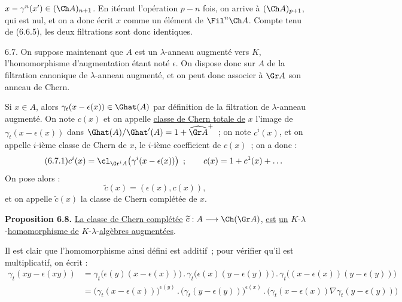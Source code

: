 
\(x-\gamma^n(x')\in(\Ch A)_{n+1}\). En
itérant l'opération \(p-n\) fois, on arrive à \((\Ch A)_{p+1}\), qui est nul, et on a donc écrit \(x\) comme un élément de \(\Fil^n\Ch A\). Compte tenu de (6.6.5), les deux filtrations sont donc identiques.

6.7. On suppose maintenant que \(A\) est un \(\lambda\)-anneau augmenté vers \(K\), l'homomorphisme d'augmentation étant noté \(\epsilon\). On dispose donc sur \(A\) de la filtration canonique de \(\lambda\)-anneau augmenté, et on peut donc associer à \(\Gr A\) son anneau de Chern.

Si \(x\in A\), alors \(\gamma_t(x-\epsilon(x))\in\Ghat(A)\) par définition de la filtration de \(\lambda\)-anneau augmenté. On note \(c(x)\) et on appelle \uline{classe de Chern totale de} \(x\) l'image de \(\gamma_t(x-\epsilon(x))\) dans \(\Ghat(A)/\Ghat'(A)=1+\widehat{\Gr A}^{+}\)~; on note \(c^i(x)\), et on appelle \(i\)-ième classe de Chern de \(x\), le \(i\)-ième coefficient de \(c(x)\)~; on a donc :
\begin{equation}\tag{6.7.1}
  c^i(x)=\cl_{\Gr^iA}\!\left(\gamma^i(x-\epsilon(x))\right)~;\qquad
  c(x)=1+c^1(x)+\ldots
\end{equation}
On pose alors :
\begin{equation}\tag{6.7.2}
  \widetilde c(x)=(\epsilon(x),c(x)),
\end{equation}
et on appelle \(\widetilde c(x)\) la classe de Chern complétée de \(x\).

\textbf{Proposition 6.8.} \uline{La classe de Chern complétée} \(\widetilde c:A\longrightarrow\Ch(\Gr A)\), \uline{est} \uline{un} \(K\)-\(\lambda\)-\uline{homomorphisme de} \(K\)-\(\lambda\)-\uline{algèbres augmentées}.

Il est clair que l'homomorphisme ainsi défini est additif~; pour vérifier qu'il est multiplicatif, on écrit :
\[
\begin{aligned}
\gamma_t(xy-\epsilon(xy))
&=\gamma_t\bigl(\epsilon(y)(x-\epsilon(x))\bigr)\mathbin{.}
  \gamma_t\bigl(\epsilon(x)(y-\epsilon(y))\bigr)\mathbin{.}
  \gamma_t\bigl((x-\epsilon(x))(y-\epsilon(y))\bigr)\\
&=\bigl(\gamma_t(x-\epsilon(x))\bigr)^{\epsilon(y)}\mathbin{.}
  \bigl(\gamma_t(y-\epsilon(y))\bigr)^{\epsilon(x)}\mathbin{.}
  \bigl(\gamma_t(x-\epsilon(x))\nabla\gamma_t(y-\epsilon(y))\bigr)
\end{aligned}
\]

